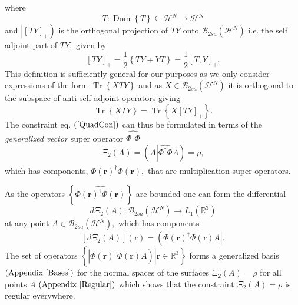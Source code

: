 \documentclass[aps,preprint]{revtex4}%
\begin{document}
where
\begin{equation}
T:\operatorname{Dom}\left\{  T\right\}  \subseteq\mathcal{H}^{N}%
\rightarrow\mathcal{H}^{N}%
\end{equation}
and $\left\vert \left[  TY\right]  _{+}\right)  $ is the orthogonal projection
of $TY$ onto $\mathcal{B}_{2sa}\left(  \mathcal{H}^{N}\right)  $ i.e. the self
adjoint part of $TY,$ given by
\[
\left[  TY\right]  _{+}=\frac{1}{2}\left\{  TY+YT\right\}  =\frac{1}{2}\left[
T,Y\right]  _{+}.
\]
This definition is sufficiently general for our purposes as we only consider
expressions of the form $\operatorname{Tr}\left\{  XTY\right\}  $ and as
$X\in\mathcal{B}_{2sa}\left(  \mathcal{H}^{N}\right)  $ it is orthogonal to
the subspace of anti self adjoint operators giving
\begin{equation}
\operatorname{Tr}\left\{  XTY\right\}  =\operatorname{Tr}\left\{  X\left[
TY\right]  _{+}\right\}  .
\end{equation}
The constraint eq. $\left(  \ref{QuadCon}\right)  $ can thus be formulated in
terms of the \emph{generalized} \emph{vector} super operator $\widehat
{\Phi^{\dagger}\Phi}$%
\begin{equation}
\Xi_{2}\left(  A\right)  =\left(  A\left\vert \widehat{\Phi^{\dagger}\Phi
}A\right.  \right)  =\rho,
\end{equation}
which has components, $\widehat{\Phi\left(  \boldsymbol{r}\right)  ^{\dagger
}\Phi\left(  \boldsymbol{r}\right)  },$ that are multiplication super operators.

As the operators $\left\{  \widehat{\Phi\left(  \boldsymbol{r}\right)
^{\dagger}\Phi\left(  \boldsymbol{r}\right)  }\right\}  $ are bounded one can
form the differential \cite{Encyclo}
\begin{equation}
d\Xi_{2}\left(  A\right)  :\mathcal{B}_{2sa}\left(  \mathcal{H}^{N}\right)
\rightarrow L_{1}\left(  \mathbb{R}^{3}\right)
\end{equation}
at any point $A\in\mathcal{B}_{2sa}\left(  \mathcal{H}^{N}\right)  ,$ which
has components
\begin{equation}
\left[  d\Xi_{2}\left(  A\right)  \right]  \left(  \boldsymbol{r}\right)
=\left(  \Phi\left(  \boldsymbol{r}\right)  ^{\dagger}\Phi\left(
\boldsymbol{r}\right)  A\right\vert .
\end{equation}
The set of operators $\left\{  \left.  \left\vert \Phi\left(  \boldsymbol{r}%
\right)  ^{\dagger}\Phi\left(  \boldsymbol{r}\right)  A\right)  \right\vert
\boldsymbol{r\in}\mathbb{R}^{3}\right\}  $ forms a generalized basis $\left(
\text{Appendix \ref{Bases}}\right)  $ for the normal spaces of the surfaces
$\Xi_{2}\left(  A\right)  =\rho$ for all points $A$ $\left(  \text{Appendix
\ref{Regular}}\right)  $ which shows that the constraint $\Xi_{2}\left(
A\right)  =\rho$ is regular everywhere.
\end{document}
